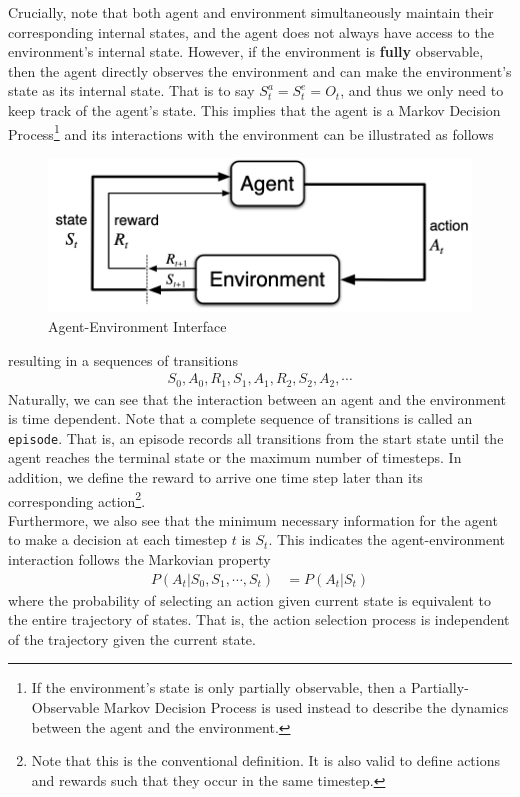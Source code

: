 \documentclass[12pt]{report}
\begin{document}
Crucially, note that both agent and environment simultaneously maintain their corresponding internal states, and the agent does not always have access to the environment's internal state. However, if the environment is \textbf{fully} observable, then the agent directly observes the environment and can make the environment's state as its internal state. That is to say $S_t^a = S_t^e = O_t$, and thus we only need to keep track of the agent's state. This implies that the agent is a Markov Decision Process\footnote{If the environment's state is only partially observable, then a Partially-Observable Markov Decision Process is used instead to describe the dynamics between the agent and the environment.} and its interactions with the environment can be illustrated \cite{sutton2018reinforcement} as follows
\begin{figure}[H]
    \center
    \includegraphics[width=0.6\linewidth]{figs/agent-env.png}
    \caption{Agent-Environment Interface}
    \label{fig:agent-env}
\end{figure}
resulting in a sequences of transitions
\begin{align}
    S_0, A_0, R_1, S_1, A_1, R_2, S_2, A_2, \cdots
\end{align}
Naturally, we can see that the interaction between an agent and the environment is time dependent. Note that a complete sequence of transitions is called an \texttt{episode}. That is, an episode records all transitions from the start state until the agent reaches the terminal state or the maximum number of timesteps. In addition, we define the reward to arrive one time step later than its corresponding action\footnote{Note that this is the conventional definition. It is also valid to define actions and rewards such that they occur in the same timestep.}.\\

Furthermore, we also see that the minimum necessary information for the agent to make a decision at each timestep $t$ is $S_t$. This indicates the agent-environment interaction follows the Markovian property
\begin{align}
    P(A_t|S_0, S_1, \cdots, S_t) &= P(A_t|S_t)
\end{align}
where the probability of selecting an action given current state is equivalent to the entire trajectory of states. That is, the action selection process is independent of the trajectory given the current state.
\end{document}
